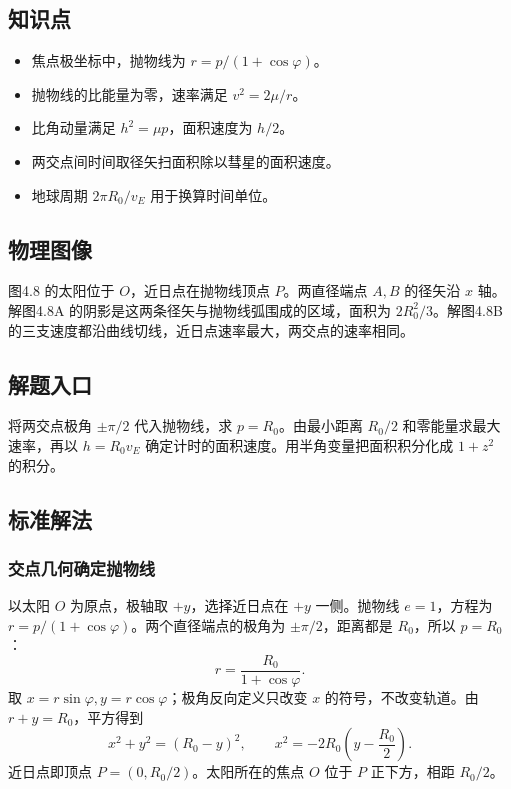 \documentclass[UTF8,fontset=fandol,a4paper,11pt]{ctexart}
\begin{document}
\subsection*{知识点}

\begin{itemize}
\item 焦点极坐标中，抛物线为 $r=p/(1+\cos\varphi)$。
\item 抛物线的比能量为零，速率满足 $v^2=2\mu/r$。
\item 比角动量满足 $h^2=\mu p$，面积速度为 $h/2$。
\item 两交点间时间取径矢扫面积除以彗星的面积速度。
\item 地球周期 $2\pi R_0/v_E$ 用于换算时间单位。
\end{itemize}




\subsection*{物理图像}

图4.8 的太阳位于 $O$，近日点在抛物线顶点 $P$。两直径端点 $A,B$ 的径矢沿 $x$ 轴。解图4.8A 的阴影是这两条径矢与抛物线弧围成的区域，面积为 $2R_0^2/3$。解图4.8B 的三支速度都沿曲线切线，近日点速率最大，两交点的速率相同。



\subsection*{解题入口}

将两交点极角 $\pm\pi/2$ 代入抛物线，求 $p=R_0$。由最小距离 $R_0/2$ 和零能量求最大速率，再以 $h=R_0v_E$ 确定计时的面积速度。用半角变量把面积积分化成 $1+z^2$ 的积分。



\subsection*{标准解法}

\subsubsection*{交点几何确定抛物线}
以太阳 $O$ 为原点，极轴取 $+y$，选择近日点在 $+y$ 一侧。抛物线 $e=1$，方程为 $r=p/(1+\cos\varphi)$。两个直径端点的极角为 $\pm\pi/2$，距离都是 $R_0$，所以 $p=R_0$：
\[
\boxed{r=\frac{R_0}{1+\cos\varphi}}.
\]
取 $x=r\sin\varphi,y=r\cos\varphi$；极角反向定义只改变 $x$ 的符号，不改变轨道。由 $r+y=R_0$，平方得到
\[
x^2+y^2=(R_0-y)^2,
\qquad \boxed{x^2=-2R_0\left(y-\frac{R_0}2\right)}.
\]
近日点即顶点 $P=(0,R_0/2)$。太阳所在的焦点 $O$ 位于 $P$ 正下方，相距 $R_0/2$。
\end{document}
